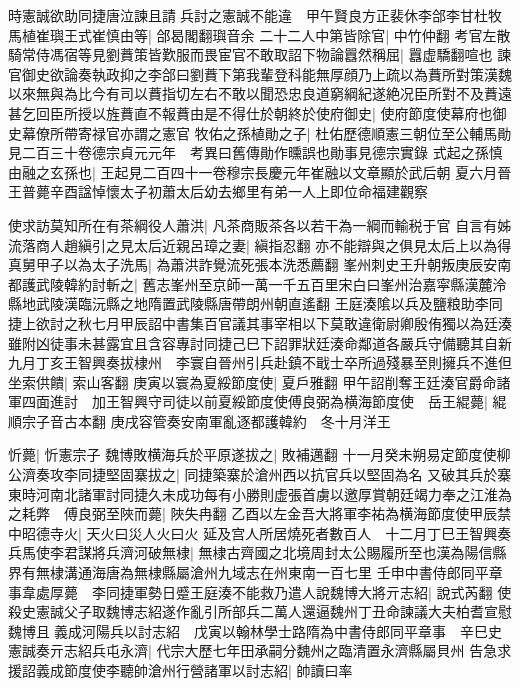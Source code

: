 時憲誠欲助同捷唐泣諫且請兵討之憲誠不能違　甲午賢良方正裴休李郃李甘杜牧馬植崔璵王式崔慎由等|{
	郃曷閣翻璵音余}
二十二人中第皆除官|{
	中竹仲翻}
考官左散騎常侍馮宿等見劉蕡策皆歎服而畏宦官不敢取詔下物論囂然稱屈|{
	囂虚驕翻喧也}
諫官御史欲論奏執政抑之李郃曰劉蕡下第我輩登科能無厚顔乃上疏以為蕡所對策漢魏以來無與為比今有司以蕡指切左右不敢以聞恐忠良道窮綱紀遂絶况臣所對不及蕡遠甚乞回臣所授以旌蕡直不報蕡由是不得仕於朝終於使府御史|{
	使府節度使幕府也御史幕僚所帶寄禄官亦謂之憲官}
牧佑之孫植勛之子|{
	杜佑歷德順憲三朝位至公輔馬勛見二百三十卷德宗貞元元年　考異曰舊傳勛作曛誤也勛事見德宗實錄}
式起之孫慎由融之玄孫也|{
	王起見二百四十一卷穆宗長慶元年崔融以文章顯於武后朝}
夏六月晉王普薨辛酉諡悼懷太子初蕭太后幼去鄉里有弟一人上即位命福建觀察

使求訪莫知所在有茶綱役人蕭洪|{
	凡茶商販茶各以若干為一綱而輸税于官}
自言有姊流落商人趙縝引之見太后近親呂璋之妻|{
	縝指忍翻}
亦不能辯與之俱見太后上以為得真舅甲子以為太子洗馬|{
	為蕭洪詐覺流死張本洗悉薦翻}
峯州刺史王升朝叛庚辰安南都護武陵韓約討斬之|{
	舊志峯州至京師一萬一千五百里宋白曰峯州治嘉寜縣漢麓泠縣地武陵漢臨沅縣之地隋置武陵縣唐帶朗州朝直遙翻}
王庭湊隂以兵及鹽粮助李同捷上欲討之秋七月甲辰詔中書集百官議其事宰相以下莫敢違衛尉卿殷侑獨以為廷湊雖附凶徒事未甚露宜且含容專討同捷己巳下詔罪狀廷湊命鄰道各嚴兵守備聽其自新九月丁亥王智興奏拔棣州　李寰自晉州引兵赴鎮不戢士卒所過殘暴至則擁兵不進但坐索供饋|{
	索山客翻}
庚寅以寰為夏綏節度使|{
	夏戶雅翻}
甲午詔削奪王廷湊官爵命諸軍四面進討　加王智興守司徒以前夏綏節度使傅良弼為横海節度使　岳王緄薨|{
	緄順宗子音古本翻}
庚戌容管奏安南軍亂逐都護韓約　冬十月洋王

忻薨|{
	忻憲宗子}
魏博敗横海兵於平原遂拔之|{
	敗補邁翻}
十一月癸未朔易定節度使柳公濟奏攻李同捷堅固寨拔之|{
	同捷築寨於滄州西以抗官兵以堅固為名}
又破其兵於寨東時河南北諸軍討同捷久未成功每有小勝則虚張首虜以邀厚賞朝廷竭力奉之江淮為之耗弊　傅良弼至陜而薨|{
	陜失冉翻}
乙酉以左金吾大將軍李祐為横海節度使甲辰禁中昭德寺火|{
	天火曰災人火曰火}
延及宫人所居燒死者數百人　十二月丁巳王智興奏兵馬使李君謀將兵濟河破無棣|{
	無棣古齊國之北境周封太公賜履所至也漢為陽信縣界有無棣溝通海唐為無棣縣屬滄州九域志在州東南一百七里}
壬申中書侍郎同平章事韋處厚薨　李同捷軍勢日蹙王庭湊不能救乃遣人說魏博大將亓志紹|{
	說式芮翻}
使殺史憲誠父子取魏博志紹遂作亂引所部兵二萬人還逼魏州丁丑命諫議大夫柏耆宣慰魏博且義成河陽兵以討志紹　戊寅以翰林學士路隋為中書侍郎同平章事　辛巳史憲誠奏亓志紹兵屯永濟|{
	代宗大歷七年田承嗣分魏州之臨清置永濟縣屬貝州}
告急求援詔義成節度使李聽帥滄州行營諸軍以討志紹|{
	帥讀曰率}


